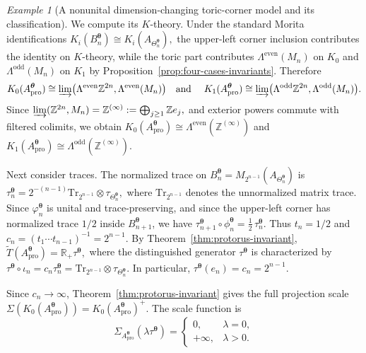 \documentclass[11pt]{amsart}
\theoremstyle{definition}
\theoremstyle{remark}
\newtheorem{example}[theorem]{Example}
\newcommand{\Z}{\mathbb{Z}}
\newcommand{\R}{\mathbb{R}}
\newcommand{\Tr}{\mathrm{Tr}}
\newcommand{\ex}{\mathrm{pro}}
\begin{document}
\begin{example}[A nonunital dimension-changing toric-corner model and its classification]
We compute its $K$-theory. Under the standard Morita identifications $K_i(B_n^{\boldsymbol\theta})
\cong
K_i(A_{\Theta_n^{\boldsymbol\theta}}),$ the upper-left corner inclusion contributes the identity on $K$-theory, while
the toric part contributes $\Lambda^{\mathrm{even}}(M_n)$ on 
$K_0$ and 
$\Lambda^{\mathrm{odd}}(M_n)$ on $K_1$
by Proposition~\ref{prop:four-cases-invariants}. Therefore
\[K_0(A_{\ex}^{\boldsymbol\theta})
\cong
\varinjlim\bigl(\Lambda^{\mathrm{even}}\Z^{2n},
\Lambda^{\mathrm{even}}(M_n)\bigr)\quad\text{and }\quad K_1(A_{\ex}^{\boldsymbol\theta})
\cong
\varinjlim\bigl(\Lambda^{\mathrm{odd}}\Z^{2n},
\Lambda^{\mathrm{odd}}(M_n)\bigr).\]
Since $\varinjlim(\Z^{2n},M_n)
=
\Z^{(\infty)}
:=
\bigoplus_{j\geq1}\Z e_j,$
and exterior powers commute with filtered colimits, we obtain $K_0(A_{\ex}^{\boldsymbol\theta})
\cong
\Lambda^{\mathrm{even}}(\Z^{(\infty)})$ and $K_1(A_{\ex}^{\boldsymbol\theta})
\cong
\Lambda^{\mathrm{odd}}(\Z^{(\infty)}).$


Next consider traces. The normalized trace on $B_n^{\boldsymbol\theta}=M_{2^{n-1}}(A_{\Theta_n^{\boldsymbol\theta}})$
is $\tau_n^{\boldsymbol\theta}=
2^{-(n-1)}
\Tr_{2^{n-1}}\otimes\tau_{\Theta_n^{\boldsymbol\theta}},$
where $\Tr_{2^{n-1}}$ denotes the unnormalized matrix trace. Since
$\varphi_n^{\boldsymbol\theta}$ is unital and trace-preserving, and since the
upper-left corner has normalized trace $1/2$ inside
$B_{n+1}^{\boldsymbol\theta}$, we have $\tau_{n+1}^{\boldsymbol\theta}\circ\phi_n^{\boldsymbol\theta}
=
\frac12\,\tau_n^{\boldsymbol\theta}.$
Thus $t_n=1/2$ and $c_n=(t_1\cdots t_{n-1})^{-1}=2^{n-1}.$ 
By Theorem~\ref{thm:protorus-invariant}, $\widetilde T(A_{\ex}^{\boldsymbol\theta})
=
\R_+\tau^{\boldsymbol\theta},$
where the distinguished generator $\tau^{\boldsymbol\theta}$ is characterized
by $\tau^{\boldsymbol\theta}\circ\iota_n
=c_n\tau_n^{\boldsymbol\theta}=\Tr_{2^{n-1}}\otimes\tau_{\Theta_n^{\boldsymbol\theta}}.$
In particular, $\tau^{\boldsymbol\theta}(e_n)=c_n=2^{n-1}.$

Since $c_n\to\infty$, Theorem~\ref{thm:protorus-invariant} gives the full
projection scale $\Sigma(K_0(A_{\ex}^{\boldsymbol\theta}))=K_0(A_{\ex}^{\boldsymbol\theta})^+.$
The scale function is
\[
\Sigma_{A_{\ex}^{\boldsymbol\theta}}(\lambda\tau^{\boldsymbol\theta})
=
\begin{cases}
0, & \lambda=0,\\
+\infty, & \lambda>0.
\end{cases}
\]


\end{example}
\end{document}
